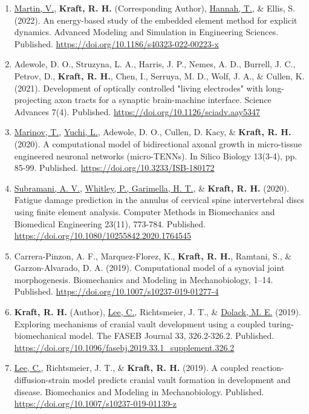 \documentclass[a4paper,10pt]{article}
\begin{document}
\begin{enumerate}
 \item	\underline{Martin, V.}, \textbf{\textbf{Kraft,} R. H.} (Corresponding Author), \underline{Hannah, T.}, \&
 Ellis, S. (2022). An energy-based study of the embedded element method for explicit dynamics. Advanced Modeling and Simulation in Engineering Sciences. Published. \url{https://doi.org/10.1186/s40323-022-00223-x}
 \item	Adewole, D. O., Struzyna, L. A., Harris, J. P., Nemes, A. D., Burrell, J. C., Petrov, D., \textbf{\textbf{Kraft,} R. H.}, Chen, I., Serruya, M. D., Wolf, J. A., \&
 Cullen, K. (2021). Development of optically controlled "living electrodes" with long-projecting axon tracts for a synaptic brain-machine interface. Science Advances 7(4). Published. \url{https://doi.org/10.1126/sciadv.aay5347}
 \item	\underline{Marinov, T.}, \underline{Yuchi, L.}, Adewole, D. O., Cullen, D. Kacy, \&
 \textbf{\textbf{Kraft,} R. H.} (2020). A computational model of bidirectional axonal growth in micro-tissue engineered neuronal networks (micro-TENNs). In Silico Biology 13(3-4), pp. 85-99. Published. \url{https://doi.org/10.3233/ISB-180172}
 \item	\underline{Subramani, A. V.}, \underline{Whitley, P., Garimella, H. T.}, \&
 \textbf{\textbf{Kraft,} R. H.} (2020). Fatigue damage prediction in the annulus of cervical spine intervertebral discs using finite element analysis. Computer Methods in Biomechanics and Biomedical Engineering 23(11), 773-784. Published. \url{https://doi.org/10.1080/10255842.2020.1764545}
 \item	Carrera-Pinzon, A. F., Marquez-Florez, K., \textbf{\textbf{Kraft,} R. H.}, Ramtani, S., \&
 Garzon-Alvarado, D. A. (2019). Computational model of a synovial joint morphogenesis. Biomechanics and Modeling in Mechanobiology, 1--14. Published. \url{https://doi.org/10.1007/s10237-019-01277-4}
 \item	\textbf{\textbf{Kraft,} R. H.} (Author), \underline{Lee, C.}, Richtsmeier, J. T., \&
 \underline{Dolack, M. E.} (2019). Exploring mechanisms of cranial vault development using a coupled turing-biomechanical model. The FASEB Journal 33, 326.2-326.2. Published. \url{https://doi.org/10.1096/fasebj.2019.33.1_supplement.326.2}
 \item	\underline{Lee, C.}, Richtsmeier, J. T., \&
 \textbf{\textbf{Kraft,} R. H.} (2019). A coupled reaction-diffusion-strain model predicts cranial vault formation in development and disease. Biomechanics and Modeling in Mechanobiology. Published. \url{https://doi.org/10.1007/s10237-019-01139-z}

\end{enumerate}
\end{document}
